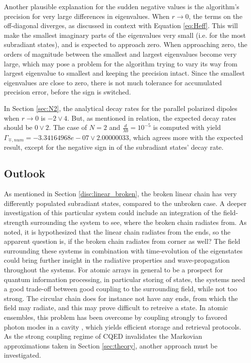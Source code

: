\documentclass{article}
\begin{document}
Another plausible explanation for the sudden negative values is the algorithm's precision for very large differences in eigenvalues. When $r\rightarrow 0$, the terms on the off-diagonal diverges, as discussed in context with Equation \ref{eq:Heff}. This will make the smallest imaginary parts of the eigenvalues very small (i.e. for the most subradiant states), and is expected to approach zero. When approaching zero, the orders of magnitude between the smallest and largest eigenvalues become very large, which may pose a problem for the algorithm trying to vary its way from largest eigenvalue to smallest and keeping the precision intact. Since the smallest eigenvalues are close to zero, there is not much tolerance for accumulated precision error, before the sign is switched. 

In Section \ref{sec:N2}, the analytical decay rates for the parallel polarized dipoles when $r \rightarrow 0$ is $-2 \vee 4$. But, as mentioned in relation, the expected decay rates should be $0 \vee 2$. The case of $N=2$ and $\frac{d}{\lambda0} = 10^{-5}$ is computed with yield $\Gamma_{\mp, num} = -3.34164968e-07 \vee 2.00000033$, which agrees more with the expected result, except for the negative sign in of the subradiant states' decay rate. 

\subsection{Outlook}\label{sec:outlook}

\noindent
As mentioned in Section \ref{disc:linear_broken}, the broken linear chain has very differently populated subradiant states, compared to the unbroken case. A deeper investigation of this particular system could include an integration of the field-strength surrounding the system to see, where the broken chain radiates from. As noted, it is hypothesized that the linear chain radiates from the ends, so the apparent question is, if the broken chain radiates from corner as well? The field surrounding these systems in combination with time-evolution of the eigenstates could bring further insight in the radiative properties and wave-propagation throughout the systems. For atomic arrays in general to be a prospect for quantum information processing, in particular storing of states, the systems need a good trade-off between good coupling to the surrounding field, while not too strong. The circular chain does for instance not have any ends, from which the field may radiate, and this may prove difficult to retreive a state. In atomic ensembles, this problem has been overcome by coupling strongly to favored photon modes in a cavity \cite{Yong}, which yields efficient storage and retrieval protocols. As the strong coupling regime of CQED invalidates the Markovian approximations taken in Section \ref{sec:theory}, another approach must be investigated. 
\end{document}
